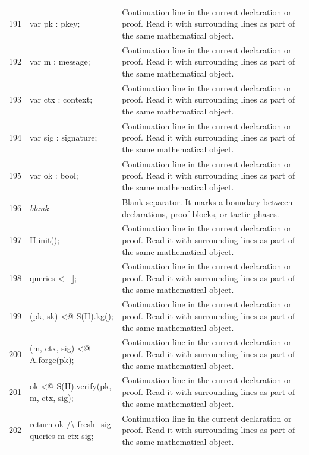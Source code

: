\documentclass[10pt]{article}
\begin{document}
\begin{longtable}{r L{0.53\textwidth} L{0.37\textwidth}}
191 & {\ttfamily\scriptsize     var pk : pkey;} & Continuation line in the current declaration or proof.  Read it with surrounding lines as part of the same mathematical object. \\
192 & {\ttfamily\scriptsize     var m : message;} & Continuation line in the current declaration or proof.  Read it with surrounding lines as part of the same mathematical object. \\
193 & {\ttfamily\scriptsize     var ctx : context;} & Continuation line in the current declaration or proof.  Read it with surrounding lines as part of the same mathematical object. \\
194 & {\ttfamily\scriptsize     var sig : signature;} & Continuation line in the current declaration or proof.  Read it with surrounding lines as part of the same mathematical object. \\
195 & {\ttfamily\scriptsize     var ok : bool;} & Continuation line in the current declaration or proof.  Read it with surrounding lines as part of the same mathematical object. \\
196 & {\ttfamily\scriptsize \emph{blank}} & Blank separator.  It marks a boundary between declarations, proof blocks, or tactic phases. \\
197 & {\ttfamily\scriptsize     H.init();} & Continuation line in the current declaration or proof.  Read it with surrounding lines as part of the same mathematical object. \\
198 & {\ttfamily\scriptsize     queries <- [];} & Continuation line in the current declaration or proof.  Read it with surrounding lines as part of the same mathematical object. \\
199 & {\ttfamily\scriptsize     (pk, sk) <@ S(H).kg();} & Continuation line in the current declaration or proof.  Read it with surrounding lines as part of the same mathematical object. \\
200 & {\ttfamily\scriptsize     (m, ctx, sig) <@ A.forge(pk);} & Continuation line in the current declaration or proof.  Read it with surrounding lines as part of the same mathematical object. \\
201 & {\ttfamily\scriptsize     ok <@ S(H).verify(pk, m, ctx, sig);} & Continuation line in the current declaration or proof.  Read it with surrounding lines as part of the same mathematical object. \\
202 & {\ttfamily\scriptsize     return ok /\textbackslash{} fresh\_sig queries m ctx sig;} & Continuation line in the current declaration or proof.  Read it with surrounding lines as part of the same mathematical object. \\

\end{longtable}
\end{document}
